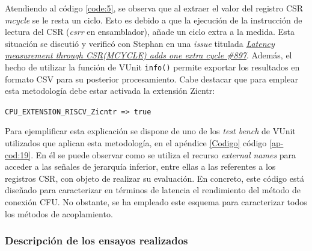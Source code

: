 Atendiendo al código \ref{code:5}, se observa que al extraer el valor del registro CSR \textit{mcycle} se le resta un ciclo.
Esto es debido a que la ejecución de la instrucción de lectura del CSR (\textit{csrr} en ensamblador), añade un ciclo extra a la medida.
Esta situación se discutió y verificó con Stephan en una \textit{issue} titulada \href{https://github.com/stnolting/neorv32/issues/897}{\textit{Latency measurement through CSR(MCYCLE) adds one extra cycle \#897}}.
Además, el hecho de utilizar la función de VUnit \texttt{info()} permite exportar los resultados en formato CSV para su posterior procesamiento.
Cabe destacar que para emplear esta metodología debe estar activada la extensión Zicntr:

\hspace{32mm} \texttt{CPU_EXTENSION_RISCV_Zicntr => true} 

Para ejemplificar esta explicación se dispone de uno de los \textit{test bench} de VUnit utilizados que aplican esta metodología, en el apéndice \ref{Codigo} código \ref{ap-cod:19}.
En él se puede observar como se utiliza el recurso \textit{external names} para acceder a las señales de jerarquía inferior, entre ellas a las referentes a los registros CSR, con objeto de realizar su evaluación.
En concreto, este código está diseñado para caracterizar en términos de latencia el rendimiento del método de conexión CFU.
No obstante, se ha empleado este esquema para caracterizar todos los métodos de acoplamiento.

%
%

\subsubsection{Descripción de los ensayos realizados}

